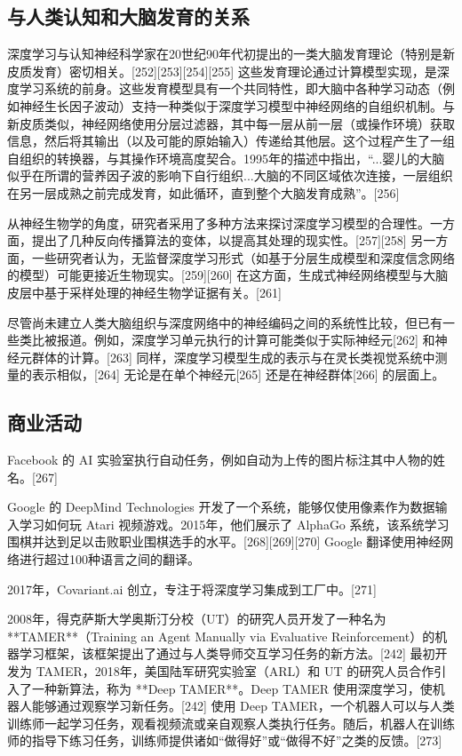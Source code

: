 \subsection{与人类认知和大脑发育的关系}  
深度学习与认知神经科学家在20世纪90年代初提出的一类大脑发育理论（特别是新皮质发育）密切相关。[252][253][254][255] 这些发育理论通过计算模型实现，是深度学习系统的前身。这些发育模型具有一个共同特性，即大脑中各种学习动态（例如神经生长因子波动）支持一种类似于深度学习模型中神经网络的自组织机制。与新皮质类似，神经网络使用分层过滤器，其中每一层从前一层（或操作环境）获取信息，然后将其输出（以及可能的原始输入）传递给其他层。这个过程产生了一组自组织的转换器，与其操作环境高度契合。1995年的描述中指出，“...婴儿的大脑似乎在所谓的营养因子波的影响下自行组织...大脑的不同区域依次连接，一层组织在另一层成熟之前完成发育，如此循环，直到整个大脑发育成熟”。[256]  

从神经生物学的角度，研究者采用了多种方法来探讨深度学习模型的合理性。一方面，提出了几种反向传播算法的变体，以提高其处理的现实性。[257][258] 另一方面，一些研究者认为，无监督深度学习形式（如基于分层生成模型和深度信念网络的模型）可能更接近生物现实。[259][260] 在这方面，生成式神经网络模型与大脑皮层中基于采样处理的神经生物学证据有关。[261]  

尽管尚未建立人类大脑组织与深度网络中的神经编码之间的系统性比较，但已有一些类比被报道。例如，深度学习单元执行的计算可能类似于实际神经元[262] 和神经元群体的计算。[263] 同样，深度学习模型生成的表示与在灵长类视觉系统中测量的表示相似，[264] 无论是在单个神经元[265] 还是在神经群体[266] 的层面上。
\subsection{商业活动}  
Facebook 的 AI 实验室执行自动任务，例如自动为上传的图片标注其中人物的姓名。[267]  

Google 的 DeepMind Technologies 开发了一个系统，能够仅使用像素作为数据输入学习如何玩 Atari 视频游戏。2015年，他们展示了 AlphaGo 系统，该系统学习围棋并达到足以击败职业围棋选手的水平。[268][269][270] Google 翻译使用神经网络进行超过100种语言之间的翻译。  

2017年，Covariant.ai 创立，专注于将深度学习集成到工厂中。[271]  

2008年，得克萨斯大学奥斯汀分校（UT）的研究人员开发了一种名为 **TAMER**（Training an Agent Manually via Evaluative Reinforcement）的机器学习框架，该框架提出了通过与人类导师交互学习任务的新方法。[242] 最初开发为 TAMER，2018年，美国陆军研究实验室（ARL）和 UT 的研究人员合作引入了一种新算法，称为 **Deep TAMER**。Deep TAMER 使用深度学习，使机器人能够通过观察学习新任务。[242] 使用 Deep TAMER，一个机器人可以与人类训练师一起学习任务，观看视频流或亲自观察人类执行任务。随后，机器人在训练师的指导下练习任务，训练师提供诸如“做得好”或“做得不好”之类的反馈。[273]  
